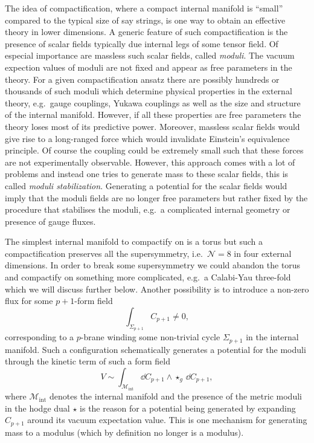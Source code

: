 The idea of compactification, where a compact internal manifold is ``small'' compared to the typical size of say strings, is one way to obtain an effective theory in lower dimensions. A generic feature of such compactification is the presence of scalar fields typically due internal legs of some tensor field. Of especial importance are massless such scalar fields, called \emph{moduli}. The vacuum expection values of moduli are not fixed and appear as free parameters in the theory. For a given compactification ansatz there are possibly hundreds or thousands of such moduli which determine physical properties in the external theory, e.g.\ gauge couplings, Yukawa couplings as well as the size and structure of the internal manifold. However, if all these properties are free parameters the theory loses most of its predictive power. Moreover, massless scalar fields would give rise to a long-ranged force which would invalidate Einstein's equivalence principle. Of course the coupling could be extremely small such that these forces are not experimentally observable. However, this approach comes with a lot of problems  and instead one tries to generate mass to these scalar fields, this is called \emph{moduli stabilization}. Generating a potential for the scalar fields would imply that the moduli fields are no longer free parameters but rather fixed by the procedure that stabilises the moduli, e.g.\ a complicated internal geometry or presence of gauge fluxes. 

The simplest internal manifold to compactify on is a torus but such a compactification preserves all the supersymmetry, i.e.\ $\mathcal{N}=8$ in four external dimensions. In order to break some supersymmetry we could abandon the torus and compactify on something more complicated, e.g.\ a Calabi-Yau three-fold which we will discuss further below. Another possibility is to introduce a non-zero flux for some $p+1$-form field 
\begin{equation}
    \int_{\Sigma_{p+1}}C_{p+1}\neq 0,
\end{equation}
corresponding to a $p$-brane winding some non-trivial cycle $\Sigma_{p+1}$ in the internal manifold. Such a configuration schematically generates a potential for the moduli through the kinetic term of such a form field 
\begin{equation}
    V\sim \int_{\mathcal{M}_{\text{int}}} \dd C_{p+1}\wedge \star_{g}\,\dd C_{p+1}, 
\end{equation}
where $\mathcal{M}_\text{int}$ denotes the internal manifold and the presence of the metric moduli in the hodge dual $\star$ is the reason for a potential being generated by expanding $C_{p+1}$ around its vacuum expectation value. This is one mechanism for generating mass to a modulus (which by definition no longer is a modulus). 

